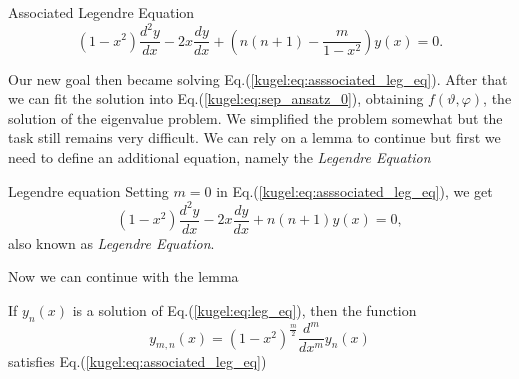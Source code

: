 \begin{definition}{Associated Legendre Equation}
    \begin{equation}\label{kugel:eq:associated_leg_eq}
        (1-x^2)\frac{d^2 y}{dx} - 2x\frac{d y}{dx} + \left( n(n+1) - \frac{m}{1-x^2} \right)y(x) = 0. 
    \end{equation}
\end{definition}
Our new goal then became solving Eq.(\ref{kugel:eq:asssociated_leg_eq}). After that we can fit the solution into Eq.(\ref{kugel:eq:sep_ansatz_0}), obtaining $f(\vartheta, \varphi)$, the solution of the eigenvalue problem. \newline
We simplified the problem somewhat but the task still remains very difficult. We can rely on a lemma to continue but first we need to define an additional equation, namely the \emph{Legendre Equation}
\begin{definition}{Legendre equation}\newline
    Setting $m=0$ in Eq.(\ref{kugel:eq:asssociated_leg_eq}), we get
    \begin{equation}\label{kugel:eq:leg_eq}
        (1-x^2)\frac{d^2 y}{dx} - 2x\frac{d y}{dx} + n(n+1)y(x) = 0,
    \end{equation}
    also known as \emph{Legendre Equation}.
\end{definition}
Now we can continue with the lemma
\begin{lemma}\label{kugel:lemma_1}
    If $y_n(x)$ is a solution of Eq.(\ref{kugel:eq:leg_eq}), then the function
    \begin{equation*}
        y_{m,n}(x) = (1-x^2)^{\frac{m}{2}}\frac{d^m}{dx^m}y_n(x)
    \end{equation*}
    satisfies Eq.(\ref{kugel:eq:associated_leg_eq})
\end{lemma}
